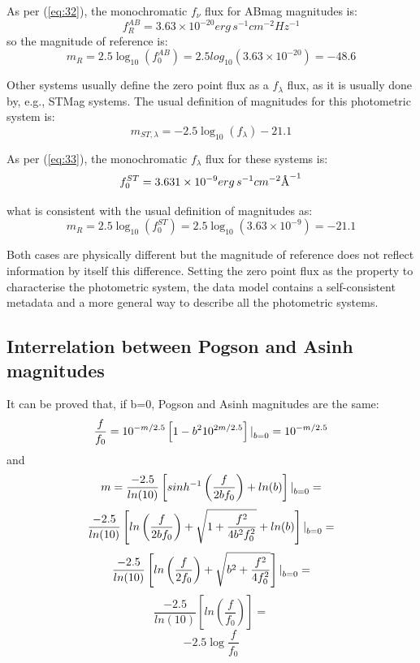 \documentclass[11pt,a4paper]{ivoa}
\newcommand{\angstrom}{\mbox{\normalfont\AA}}
\begin{document}
\begin{appendices}
As per (\ref{eq:32}), the monochromatic $f_\nu $ flux for ABmag magnitudes is:
\begin{equation} \label{eq:38}
f_{R}^{AB}=3.63 \times 10^{-20} erg\, s^{-1} cm^{-2} Hz^{-1}
\end{equation}
so the magnitude of reference is:
\begin{equation} \label{eq:39}
m_R = 2.5\log_{10} (f_{0}^{AB})=2.5 log_{10}(3.63\times 10^{-20})=-48.6
\end{equation}

Other systems usually define the zero point flux as a $f_\lambda $ flux, as
it is usually done by, e.g., STMag systems. The usual definition of magnitudes for this photometric system is:
\begin{equation} \label{eq:40}
m_{ST,\lambda }=-2.5\log_{10} (f_\lambda )-21.1
\end{equation}

As per (\ref{eq:33}), the monochromatic
$f_\lambda $ flux for these systems is:
\begin{equation} \label{eq:41}
f_0 ^{ST} = 3.631 \times 10^{-9} erg\, s^{-1} cm^{-2} \angstrom ^{-1}
\end{equation}

what is consistent with the usual definition of magnitudes as:
\begin{equation} \label{eq:42}
m_R =2.5\log_{10} (f_0 ^{ST})=2.5\log_{10} (3.63\times 10^{-9})=-21.1
\end{equation}
\par
Both cases are physically different but the magnitude of reference does not
reflect information by itself this difference. Setting the zero point flux as the
property to characterise the photometric system, the data model contains a 
self-consistent metadata and a more general way to describe all the photometric
systems.

\subsection{Interrelation between Pogson and Asinh magnitudes}
It can be proved that, if b=0, Pogson and Asinh magnitudes are the same:
\begin{equation} \label{eq:43}
\frac{f}{f_0}=10^{-m/2.5}\left[ 1-b^2 10^{2m/2.5}\right] \text{\textbar}_{b=0} =10^{-m/2.5}
\end{equation}
and
\begin{equation} \label{eq:44}
m=\frac{-2.5}{ln(10)}\left[ sinh^{-1} \left(\frac{f}{2bf_0}\right) + ln(b)\right] \text{\textbar}_{b=0} =
\end{equation}
\[
\frac{-2.5}{ln(10)}\left[ ln\left(\frac{f}{2bf_0}\right) + \sqrt{1+\frac{f^2}{4b^2 f_0^2}} + ln(b)\right] \text{\textbar}_{b=0} =
\]
\[
\frac{-2.5}{ln(10)}\left[ ln\left(\frac{f}{2f_0}\right) + \sqrt{b^2+\frac{f^2}{4 f_0^2}}\right] \text{\textbar}_{b=0} =
\]
\[
\frac{-2.5}{ln(10)}\left[ ln(\frac{f}{f_0}) \right] =
\]
\[
-2.5\log{\frac{f}{f_0}}
\]



\end{appendices}
\end{document}
